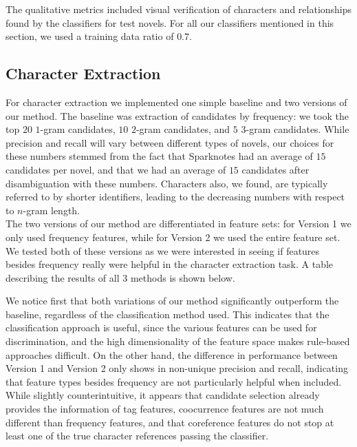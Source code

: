 \documentclass[12pt]{article}
\begin{document}
    The qualitative metrics included visual verification of characters and relationships found 
    by the classifiers for test novels. For all our classifiers mentioned in this section, we 
    used a training data ratio of $0.7$. 

    \subsection{Character Extraction}
        
        For character extraction we implemented one simple baseline and two versions of our method.
        The baseline was extraction of candidates by frequency: we took the top $20$ $1$-gram candidates,
        $10$ $2$-gram candidates, and $5$ $3$-gram candidates. While precision and recall will vary
        between different types of novels, our choices for these numbers stemmed
        from the fact that Sparknotes had an average of $15$ candidates per novel, and that we had an average of
        $15$ candidates after disambiguation with these numbers. Characters also, we found, are typically
        referred to by shorter identifiers, leading to the decreasing numbers with respect to $n$-gram length. \\

        The two versions of our method are differentiated in feature sets: for Version 1 we only used
        frequency features, while for Version 2 we used the entire feature set. We tested both of these versions
        as we were interested in seeing if features besides frequency really were helpful in the character
        extraction task. A table describing the results of all $3$ methods is shown below. 


        We notice first that both variations of our method significantly outperform the baseline, regardless
        of the classification method used. This indicates that the classification approach is useful,
        since the various features can be used for discrimination, and the high dimensionality of the feature
        space makes rule-based approaches difficult. On the other hand, the difference in performance
        between Version 1 and Version 2 only shows in non-unique precision and recall, indicating that
        feature types besides frequency are not particularly helpful when included. While slightly
        counterintuitive, it appears that candidate selection already provides the information of tag
        features, coocurrence features are not much different than frequency features, and that coreference
        features do not stop at least one of the true character references passing the classifier. \\
\end{document}
